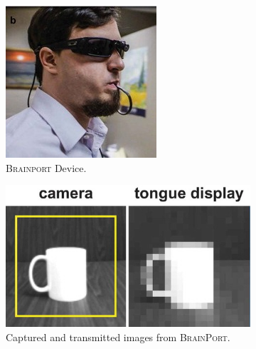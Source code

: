 \documentclass[
12pt, %
oneside, %
english, %
doublespacing, %
headsepline, %
]{MastersDoctoralThesis} %
\begin{document}
\begin{figure}[th]
	\centering
  \begin{subfigure}[b]{0.4\textwidth}
    \includegraphics[height=0.75\textwidth]{images/Brainport}
		\decoRule
    \caption[\textsc{BrainPort} Device]{\textsc{Brainport} Device.}
    \label{fig:bp1}
  \end{subfigure}
  \begin{subfigure}[b]{0.4\textwidth}
    \includegraphics[height=0.75\textwidth]{images/Brainport2}
		\decoRule
    \caption[\textsc{BrainPort} images]{Captured and transmitted images from \textsc{BrainPort}.}
    \label{fig:bp2}
  \end{subfigure}
	\caption[\textsc{BrainPort} implementation]{}
\end{figure}
\end{document}
